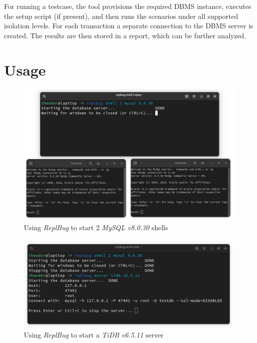 For running a testcase, the tool provisions the required DBMS instance, executes the setup script (if present), and then runs the scenarios under all supported isolation levels. For each transaction a separate connection to the DBMS server is created. The results are then stored in a report, which can be further analyzed.

\section{Usage}



\begin{figure}
    \centering
    \includegraphics[width=\linewidth]{assets/replbug_shell.png}
    \caption{Using \textit{ReplBug} to start 2 \textit{MySQL v8.0.30} shells}
    \label{fig:replb_shell}
\end{figure}

\begin{figure}
    \centering
    \includegraphics[width=\linewidth]{assets/replbug_server.png}
    \caption{Using \textit{ReplBug} to start a \textit{TiDB v6.5.11} server}
    \label{fig:repl_server}
\end{figure}

